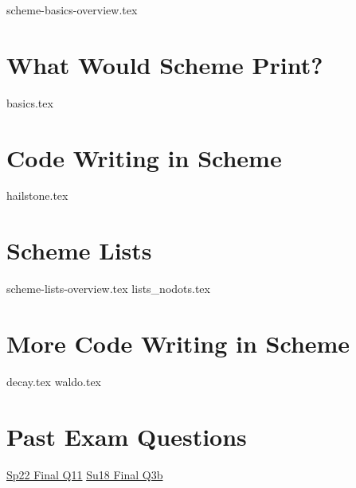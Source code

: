 \documentclass{exam}
\begin{document}
{scheme-basics-overview.tex}
\begin{questions}
\newpage
\section{What Would Scheme Print?}
{basics.tex}

\section{Code Writing in Scheme}
{hailstone.tex}

\section{Scheme Lists}
{scheme-lists-overview.tex}
\newpage
{lists_nodots.tex}

\section{More Code Writing in Scheme}
{decay.tex}
{waldo.tex}

\newpage
\section{Past Exam Questions}
\begin{outline}[enumerate]
    \1 \href{https://cs61a.org/exam/sp22/final/61a-sp22-final_sol.pdf#page=23}{Sp22 Final Q11}
    \1 \href{https://inst.eecs.berkeley.edu/~cs61a/su18/assets/pdfs/61a-su18-final-sol.pdf#page=4}{Su18 Final Q3b}
\end{outline}

\end{questions}
\end{document}
